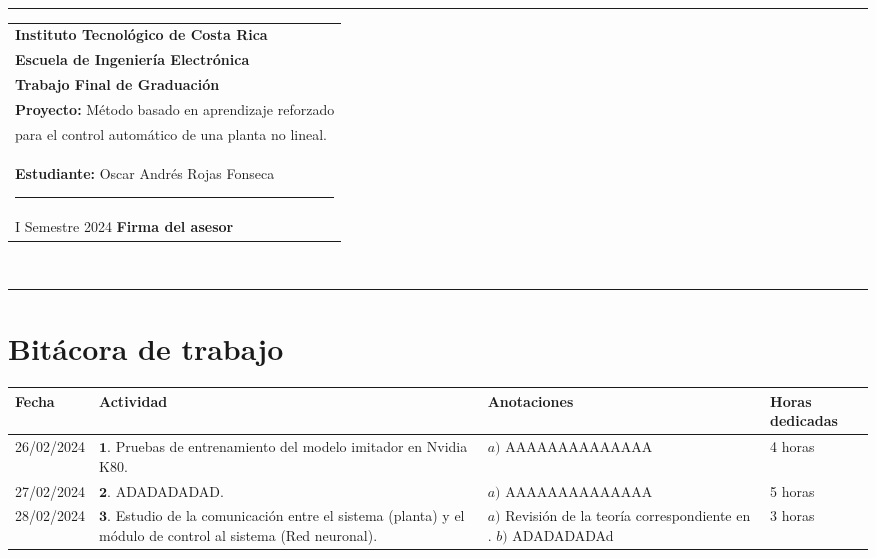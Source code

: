 \documentclass[12pt]{article}
\begin{document}
\hfill\\
\rule{\textwidth}{1.5pt}

\begin{minipage}[t]{85mm}
  \begin{tabular}{l}
    \textbf{\large Instituto Tecnológico de Costa Rica} \\  
    \textbf{Escuela de Ingeniería Electrónica} \\
    \textbf{Trabajo Final de Graduación} \\
    \textbf{Proyecto:} Método basado en aprendizaje reforzado \\para el control automático de una planta no lineal. \\
    \textbf{Estudiante:} Oscar Andrés Rojas Fonseca \hspace{3cm}\rule{4.5cm}{1.5pt}\\
    I Semestre 2024 \hspace{8.5cm}\textbf{Firma del asesor}
  \end{tabular}
\end{minipage}
\hfill\\
\rule{\textwidth}{1.5pt}


\section*{Bitácora de trabajo}

\begin{minipage}[h]{\textwidth}
	\centering
	\begin{tabularx}{\textwidth}{|p{2cm}|X|X|p{2cm}|} 
		\hline
		\rowcolor{encabezado}
		\textbf{Fecha} & 
		\textbf{Actividad} & 
		\textbf{Anotaciones} & 
		\textbf{Horas dedicadas} \\ \hline
		26/02/2024 & 
		$\mathbf{1}.$ Pruebas de entrenamiento del modelo imitador en Nvidia K80. & 
		$a)$ AAAAAAAAAAAAAA \newline  & 
		4 horas \\
	 	27/02/2024 & 
	 	$\mathbf{2}.$ ADADADADAD. &
	 	$a)$ AAAAAAAAAAAAAA \newline  & 
	 	5 horas \\
	 	28/02/2024 & 
	 	$\mathbf{3}.$ Estudio de la comunicación entre el sistema (planta) y el módulo de control al sistema (Red neuronal). & 
	 	$a)$ Revisión de la teoría correspondiente en \cite{DataScience}. \newline 
	 	$b)$ ADADADADAd \newline & 
	 	3 horas \\
	 	
	 	\hline
	\end{tabularx}
\end{minipage}	 	
	 	
\end{document}

